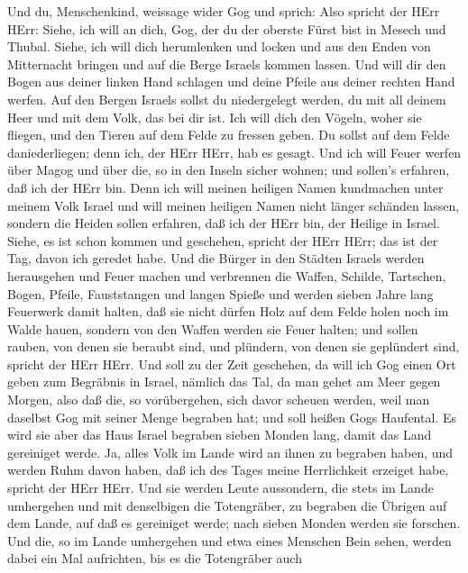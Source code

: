 Und du, Menschenkind, weissage wider Gog und sprich: Also
spricht der HErr HErr: Siehe, ich will an dich, Gog, der du der oberste
Fürst bist in Mesech und Thubal.  Siehe, ich will dich
herumlenken und locken und aus den Enden von Mitternacht bringen und auf
die Berge Israels kommen lassen.  Und will dir den Bogen aus
deiner linken Hand schlagen und deine Pfeile aus deiner rechten Hand
werfen.  Auf den Bergen Israels sollst du niedergelegt
werden, du mit all deinem Heer und mit dem Volk, das bei dir ist. Ich
will dich den Vögeln, woher sie fliegen, und den Tieren auf dem Felde zu
fressen geben.  Du sollst auf dem Felde daniederliegen; denn
ich, der HErr HErr, hab es gesagt.  Und ich will Feuer
werfen über Magog und über die, so in den Inseln sicher wohnen; und
sollen's erfahren, daß ich der HErr bin.  Denn ich will
meinen heiligen Namen kundmachen unter meinem Volk Israel und will
meinen heiligen Namen nicht länger schänden lassen, sondern die Heiden
sollen erfahren, daß ich der HErr bin, der Heilige in Israel.
 Siehe, es ist schon kommen und geschehen, spricht der HErr
HErr; das ist der Tag, davon ich geredet habe.  Und die
Bürger in den Städten Israels werden herausgehen und Feuer machen und
verbrennen die Waffen, Schilde, Tartschen, Bogen, Pfeile, Fauststangen
und langen Spieße und werden sieben Jahre lang Feuerwerk damit halten,
 daß sie nicht dürfen Holz auf dem Felde holen noch im
Walde hauen, sondern von den Waffen werden sie Feuer halten; und sollen
rauben, von denen sie beraubt sind, und plündern, von denen sie
geplündert sind, spricht der HErr HErr.  Und soll zu der
Zeit geschehen, da will ich Gog einen Ort geben zum Begräbnis in Israel,
nämlich das Tal, da man gehet am Meer gegen Morgen, also daß die, so
vorübergehen, sich davor scheuen werden, weil man daselbst Gog mit
seiner Menge begraben hat; und soll heißen Gogs Haufental. 
Es wird sie aber das Haus Israel begraben sieben Monden lang, damit das
Land gereiniget werde.  Ja, alles Volk im Lande wird an
ihnen zu begraben haben, und werden Ruhm davon haben, daß ich des Tages
meine Herrlichkeit erzeiget habe, spricht der HErr HErr. 
Und sie werden Leute aussondern, die stets im Lande umhergehen und mit
denselbigen die Totengräber, zu begraben die Übrigen auf dem Lande, auf
daß es gereiniget werde; nach sieben Monden werden sie forschen.
 Und die, so im Lande umhergehen und etwa eines Menschen
Bein sehen, werden dabei ein Mal aufrichten, bis es die Totengräber auch
